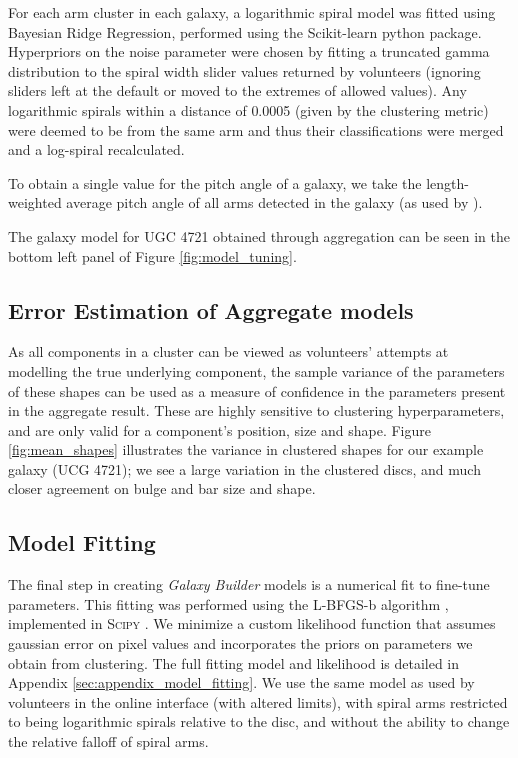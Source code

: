 \documentclass[../main.tex]{subfiles}
\begin{document}
For each arm cluster in each galaxy, a logarithmic spiral model was fitted using Bayesian Ridge Regression, performed using the Scikit-learn python package. Hyperpriors on the noise parameter were chosen by fitting a truncated gamma distribution \citep{2014arXiv1401.0287Z} to the spiral width slider values returned by volunteers (ignoring sliders left at the default or moved to the extremes of allowed values). Any logarithmic spirals within a distance of 0.0005 (given by the clustering metric) were deemed to be from the same arm and thus their classifications were merged and a log-spiral recalculated.

To obtain a single value for the pitch angle of a galaxy, we take the length-weighted average pitch angle of all arms detected in the galaxy (as used by \citealt{Davis2014:1402.1910v1}).

The galaxy model for UGC 4721 obtained through aggregation can be seen in the bottom left panel of Figure \ref{fig:model_tuning}.


\subsection{Error Estimation of Aggregate models}
\label{sec:error_estimation}

As all components in a cluster can be viewed as volunteers' attempts at modelling the true underlying component, the sample variance of the parameters of these shapes can be used as a measure of confidence in the parameters present in the aggregate result. These are highly sensitive to clustering hyperparameters, and are only valid for a component's position, size and shape. Figure \ref{fig:mean_shapes} illustrates the variance in clustered shapes for our example galaxy (UCG 4721); we see a large variation in the clustered discs, and much closer agreement on bulge and bar size and shape.

\subsection{Model Fitting}


The final step in creating \textit{Galaxy Builder} models is a numerical fit to fine-tune parameters. This fitting was performed using the L-BFGS-b algorithm \citep{doi:10.1137/0916069}, implemented in \textsc{Scipy} \citep{scipy-paper}. We minimize a custom likelihood function that assumes gaussian error on pixel values and incorporates the priors on parameters we obtain from clustering. The full fitting model and likelihood is detailed in Appendix \ref{sec:appendix_model_fitting}. We use the same model as used by volunteers in the online interface (with altered limits), with spiral arms restricted to being logarithmic spirals relative to the disc, and without the ability to change the relative falloff of spiral arms.
\end{document}
